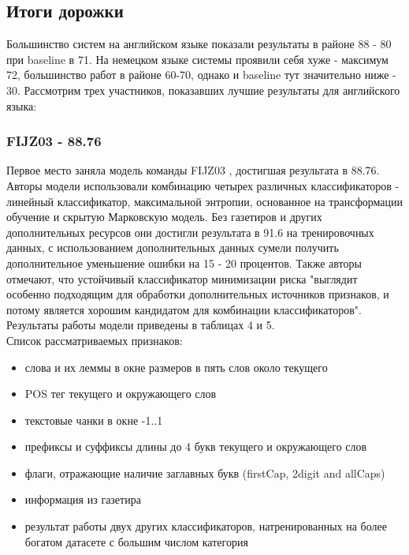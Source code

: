\subsection{Итоги дорожки}

Большинство систем на английском языке показали результаты в районе 88 - 80 при baseline в 71. На немецком языке системы проявили себя хуже - максимум 72, большинство работ в районе 60-70, однако и baseline тут значительно ниже - 30. Рассмотрим трех участников, показавших лучшие результаты для английского языка:

\subsubsection{FIJZ03 - 88.76}

Первое место заняла модель команды FIJZ03 \cite{Florian:2003:NER:1119176.1119201}, достигшая результата в 88.76. Авторы модели использовали комбинацию четырех различных классификаторов - линейный классификатор, максимальной энтропии, основанное на трансформации обучение и скрытую Марковскую модель. Без газетиров и других дополнительных ресурсов они достигли результата в 91.6 на тренировочных данных, с использованием дополнительных данных сумели получить дополнительное уменьшение ошибки на 15 - 20 процентов. Также авторы отмечают, что устойчивый классификатор минимизации риска "выглядит особенно подходящим для обработки дополнительных источников признаков, и потому является хорошим кандидатом для комбинации классификаторов". Результаты работы модели приведены в таблицах 4 и 5.\\


Список рассматриваемых признаков:
\begin{itemize}
\setlength\itemsep{0em}
\item слова и их леммы в окне размеров в пять слов около текущего
\item POS тег текущего и окружающего слов
\item текстовые чанки в окне -1..1
\item префиксы и суффиксы длины до 4 букв текущего и окружающего слов
\item флаги, отражающие наличие заглавных букв (firstCap, 2digit and allCaps)
\item информация из газетира
\item результат работы двух других классификаторов, натренированных на более богатом датасете с большим числом категория
\end{itemize}

